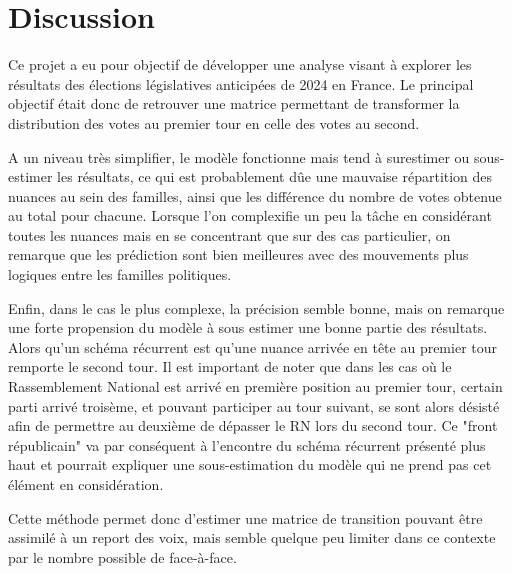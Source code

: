 \documentclass[11pt]{article}
\begin{document}
    \newpage
    \section{Discussion}
        Ce projet a eu pour objectif de développer une analyse visant à explorer les résultats des élections législatives anticipées de 2024 en France. Le principal objectif était donc de retrouver une matrice permettant de transformer la distribution des votes au premier tour en celle des votes au second. 

        A un niveau très simplifier, le modèle fonctionne mais tend à surestimer ou sous-estimer les résultats, ce qui est probablement dûe une mauvaise répartition des nuances au sein des familles, ainsi que les différence du nombre de votes obtenue au total pour chacune. 
        Lorsque l'on complexifie un peu la tâche en considérant toutes les nuances mais en se concentrant que sur des cas particulier, on remarque que les prédiction sont bien meilleures avec des mouvements plus logiques entre les familles politiques. 

        Enfin, dans le cas le plus complexe, la précision semble bonne, mais on remarque une forte propension du modèle à sous estimer une bonne partie des résultats. Alors qu'un schéma récurrent est qu'une nuance arrivée en tête au premier tour remporte le second tour. Il est important de noter que dans les cas où le Rassemblement National est arrivé en première position au premier tour, certain parti arrivé troisème, et pouvant participer au tour suivant, se sont alors désisté afin de permettre au deuxième de dépasser le RN lors du second tour. Ce "front républicain" va par conséquent à l'encontre du schéma récurrent présenté plus haut et pourrait expliquer une sous-estimation du modèle qui ne prend pas cet élément en considération. 

        Cette méthode permet donc d'estimer une matrice de transition pouvant être assimilé à un report des voix, mais semble quelque peu limiter dans ce contexte par le nombre possible de face-à-face.

    \printbibliography
\end{document}
